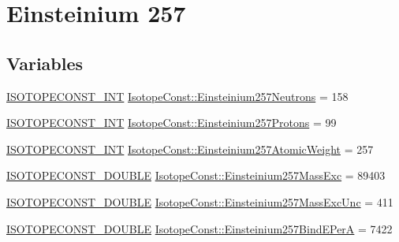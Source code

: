 \hypertarget{group___isotope_const-_einsteinium-_es257}{}\section{Einsteinium 257}
\label{group___isotope_const-_einsteinium-_es257}
\subsection*{Variables}
\begin{DoxyCompactItemize}
\item 
\mbox{\hyperlink{group___isotope_const-_macros_ga5f18360b3e99483a35c32d789e62621c}{I\+S\+O\+T\+O\+P\+E\+C\+O\+N\+S\+T\+\_\+\+I\+NT}} \mbox{\hyperlink{group___isotope_const-_einsteinium-_es257_gaf547cfbd0c6ba497164962c70b5edd17}{Isotope\+Const\+::\+Einsteinium257\+Neutrons}} = 158
\item 
\mbox{\hyperlink{group___isotope_const-_macros_ga5f18360b3e99483a35c32d789e62621c}{I\+S\+O\+T\+O\+P\+E\+C\+O\+N\+S\+T\+\_\+\+I\+NT}} \mbox{\hyperlink{group___isotope_const-_einsteinium-_es257_ga478ed081f8b209d69afc82ec2172955f}{Isotope\+Const\+::\+Einsteinium257\+Protons}} = 99
\item 
\mbox{\hyperlink{group___isotope_const-_macros_ga5f18360b3e99483a35c32d789e62621c}{I\+S\+O\+T\+O\+P\+E\+C\+O\+N\+S\+T\+\_\+\+I\+NT}} \mbox{\hyperlink{group___isotope_const-_einsteinium-_es257_gae3c247a068cc34afc9750f40aa5d1e61}{Isotope\+Const\+::\+Einsteinium257\+Atomic\+Weight}} = 257
\item 
\mbox{\hyperlink{group___isotope_const-_macros_ga8f45a7272ce02c0b4c65c44636ed719a}{I\+S\+O\+T\+O\+P\+E\+C\+O\+N\+S\+T\+\_\+\+D\+O\+U\+B\+LE}} \mbox{\hyperlink{group___isotope_const-_einsteinium-_es257_gacd861c30bed4355d77f906b621021ed3}{Isotope\+Const\+::\+Einsteinium257\+Mass\+Exc}} = 89403
\item 
\mbox{\hyperlink{group___isotope_const-_macros_ga8f45a7272ce02c0b4c65c44636ed719a}{I\+S\+O\+T\+O\+P\+E\+C\+O\+N\+S\+T\+\_\+\+D\+O\+U\+B\+LE}} \mbox{\hyperlink{group___isotope_const-_einsteinium-_es257_gab885b225a299b464c17568a027aee73b}{Isotope\+Const\+::\+Einsteinium257\+Mass\+Exc\+Unc}} = 411
\item 
\mbox{\hyperlink{group___isotope_const-_macros_ga8f45a7272ce02c0b4c65c44636ed719a}{I\+S\+O\+T\+O\+P\+E\+C\+O\+N\+S\+T\+\_\+\+D\+O\+U\+B\+LE}} \mbox{\hyperlink{group___isotope_const-_einsteinium-_es257_ga61367dad7a146d0208823b27f87bc5ad}{Isotope\+Const\+::\+Einsteinium257\+Bind\+E\+PerA}} = 7422
\item 

\end{DoxyCompactItemize}
